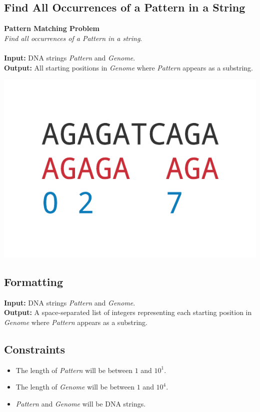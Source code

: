 \documentclass{article}
\begin{document}
\subsection{Find All Occurrences of a Pattern in a String}
\hline\vspace{5}
\noindent \textbf{Pattern Matching Problem}\\
\emph{Find all occurrences of a Pattern in a string}.\\ \\
\textbf{Input:} DNA strings \emph{Pattern} and \emph{Genome}.\\
\textbf{Output:} All starting positions in \emph{Genome} where \emph{Pattern} appears as a substring.
\begin{center}
    \includegraphics[scale=0.24]{c1/logos/1D.png} 
\end{center}
\hline\vspace{5}

\subsection*{Formatting}
\textbf{Input:} DNA strings \emph{Pattern} and \emph{Genome}.\\
\noindent \textbf{Output:} A space-separated list of integers representing each starting position in \emph{Genome} where \emph{Pattern} appears as a substring.

\subsection*{Constraints}
\begin{itemize}
    \item The length of \emph{Pattern} will be between $1$ and $10^1$.
    \item The length of \emph{Genome} will be between $1$ and $10^4$.
    \item \emph{Pattern} and \emph{Genome} will be DNA strings.
\end{itemize}
\pagebreak
\end{document}
